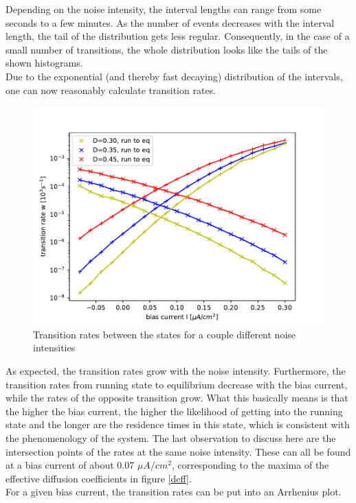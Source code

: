 \documentclass[12pt,a4paper]{article}
\begin{document}
Depending on the noise intensity, the interval lengths can range from some seconds to a few minutes. As the number of events decreases with the interval length, the tail of the distribution gets less regular. Consequently, in the case of a small number of transitions, the whole distribution looks like the tails of the shown histograms.\\
Due to the exponential (and thereby fast decaying) distribution of the intervals, one can now reasonably calculate transition rates.
\begin{figure}[H]
	\centering
	\includegraphics[scale=1]{tranratesneur2.pdf}\caption{Transition rates between the states for a couple different noise intensities}
	\label{tranrateneur}
\end{figure}
As expected, the transition rates grow with the noise intensity. Furthermore, the transition rates from running state to equilibrium decrease with the bias current, while the rates of the opposite transition grow. What this basically means is that the higher the bias current, the higher the likelihood of getting into the running state and the longer are the residence times in this state, which is consistent with the phenomenology of the system. The last observation to discuss here are the intersection points of the rates at the same noise intensity. These can all be found at a bias current of about 0.07 $\mu A/cm^2$, corresponding to the maxima of the effective diffusion coefficients in figure \ref{deff}.
\\
For a given bias current, the transition rates can be put into an Arrhenius plot.
\end{document}
